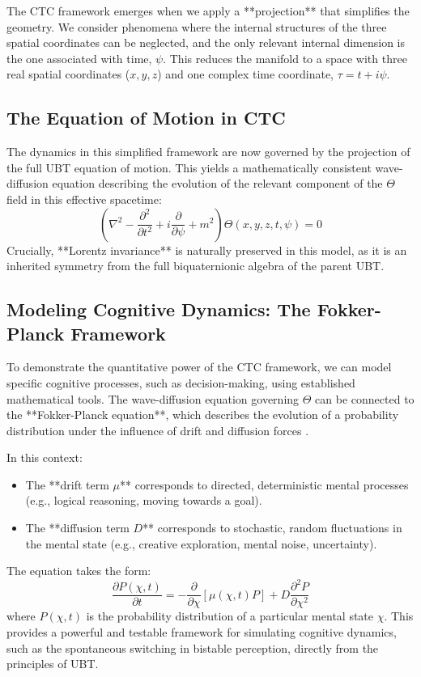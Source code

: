 \documentclass[12pt, a4paper]{article}
\begin{document}
The CTC framework emerges when we apply a **projection** that simplifies the geometry. We consider phenomena where the internal structures of the three spatial coordinates can be neglected, and the only relevant internal dimension is the one associated with time, \( \psi \). This reduces the manifold to a space with three real spatial coordinates (\(x, y, z\)) and one complex time coordinate, \( \tau = t + i\psi \).

\subsection{The Equation of Motion in CTC}
The dynamics in this simplified framework are now governed by the projection of the full UBT equation of motion. This yields a mathematically consistent wave-diffusion equation describing the evolution of the relevant component of the \( \Theta \) field in this effective spacetime:
\begin{equation}
    \left( \nabla^2 - \frac{\partial^2}{\partial t^2} + i \frac{\partial}{\partial \psi} + m^2 \right)\Theta(x,y,z,t,\psi) = 0
\end{equation}
Crucially, **Lorentz invariance** is naturally preserved in this model, as it is an inherited symmetry from the full biquaternionic algebra of the parent UBT.

\subsection{Modeling Cognitive Dynamics: The Fokker-Planck Framework}
To demonstrate the quantitative power of the CTC framework, we can model specific cognitive processes, such as decision-making, using established mathematical tools. The wave-diffusion equation governing \( \Theta \) can be connected to the **Fokker-Planck equation**, which describes the evolution of a probability distribution under the influence of drift and diffusion forces \cite{risken1996fokker}.

In this context:
\begin{itemize}
    \item The **drift term \( \mu \)** corresponds to directed, deterministic mental processes (e.g., logical reasoning, moving towards a goal).
    \item The **diffusion term \( D \)** corresponds to stochastic, random fluctuations in the mental state (e.g., creative exploration, mental noise, uncertainty).
\end{itemize}
The equation takes the form:
\begin{equation}
    \frac{\partial P(\chi, t)}{\partial t} = -\frac{\partial}{\partial \chi}[\mu(\chi,t)P] + D \frac{\partial^2 P}{\partial \chi^2}
\end{equation}
where \( P(\chi, t) \) is the probability distribution of a particular mental state \( \chi \). This provides a powerful and testable framework for simulating cognitive dynamics, such as the spontaneous switching in bistable perception, directly from the principles of UBT.
\end{document}
